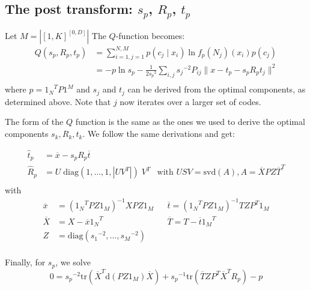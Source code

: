 \documentclass[10pt,a4paper,oneside]{article}
\theoremstyle{definition}
\newcommand{\ol}[1]{\overline{#1}}
\theoremstyle{definition}
\begin{document}
\subsection{The post transform: $s_p$, $R_p$, $t_p$} Let $M = \left |[1,K]^{[0,D]}\right|$ The $Q$-function becomes:
\begin{align*}
Q(s_p, R_p, t_p) &= \sum_{i=1,j=1}^{N,M} p(c_j\mid x_i) \ln f_p(N_j)(x_i) p(c_j) \\
&= - p\ln s_p  - \frac{1}{2 {s_p}^2} \sum_{i, j} {s_j}^{-2} P_{ij} \| x - t_p -s_pR_pt_j \|^2 \\
\end{align*}
where $p = {1_N}^T P 1^M$ and $s_j$ and $t_j$ can be derived from the optimal components, as determined above. Note that $j$ now iterates over a larger set of codes.

The form of the $Q$ function is the same as the ones we used to derive the optimal components $s_k, R_k, t_k$. We follow the same derivations and get: 

\begin{align*}
\hat t_p &= \overline{x} - s_pR_p\overline{t}\\
\hat R_p &= U\;\text{diag}(1, \ldots, 1, |UV^T|)\;V^T & \text{with } USV = \text{svd}(A), A = \ol{X} P Z {\ol{T}}^T \\
\end{align*}
with 
\begin{align*}
\ol{x} &= ({1_N}^TPZ1_M)^{-1} XPZ1_M & & \ol{t} = ({1_N}^TPZ1_M)^{-1}TZP^T1_M\\
\ol{X} &= X - \overline{x}{1_N}^T & &\ol{T} = T - \overline{t} {1_M}^T\\
Z &= \text{diag}({s_1}^{-2}, \ldots, {s_M}^{-2})\\
\end{align*}

Finally, for $s_p$, we solve
\[
0 = {s_p}^{-2}\text{tr}(\ol{X}^T\text{d}(PZ1_M)\ol{X}) + {s_p}^{-1} \text{tr}(\ol{T}ZP^T\ol{X}^TR_p) - p
\]
\end{document}
